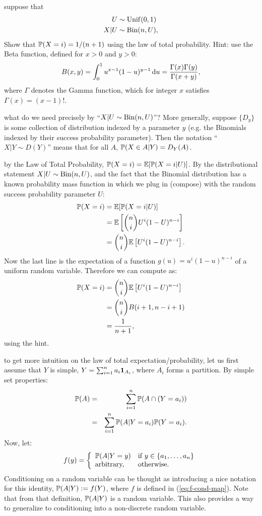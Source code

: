 \documentclass{article}
\begin{document}
 suppose that
\begin{eqnarray*}
U &\sim \Unif(0,1) \\
X | U &\sim \Bin(n, U),
\end{eqnarray*}
Show that $\P(X = i) = 1/(n+1)$ using the law of total probability. Hint: use the Beta function, defined for $x> 0$ and $y > 0$:
\[ B(x, y) = \int_0^1 u^{x-1} (1-u)^{y-1} \ud u = \frac{\Gamma(x) \Gamma(y)}{\Gamma(x+y)}, \]
where $\Gamma$ denotes the Gamma function, which for integer $x$ satisfies $\Gamma(x) = (x-1)!$.

 what do we need precisely by ``$X | U \sim \Bin(n, U)$''? More generally, suppose $\{D_y\}$ is some collection of distribution indexed by a parameter $y$ (e.g. the Binomials indexed by their success probability parameter). Then the notation ``$X|Y\sim D(Y)$'' means that for all $A$, $\P(X\in A|Y) = D_Y(A)$.

 by the Law of Total Probability, $\P(X=i) = \E[ \P(X=i | U) ]$. By the distributional statement $X|U \sim \Bin(n, U)$, and the fact that the Binomial distribution has a known probability mass function in which we plug in (compose) with the random success probability parameter $U$:
\begin{align*}
	\P(X = i) &= \E[ \P(X=i | U)] \\
	&= \E\left[ \binom{n}{i} U^i (1 - U)^{n-i} \right] \\
	&= \binom{n}{i} \E\left[ U^i (1-U)^{n-i} \right].
\end{align*}
Now the last line is the expectation of a function $g(u) = u^i (1-u)^{n-i}$ of a uniform random variable. Therefore we can compute as:
\begin{align*}
	\P(X = i) &= \binom{n}{i} \E\left[ U^i (1-U)^{n-i} \right] \\
	&= \binom{n}{i} B(i+1, n - i + 1) \\
	&= \frac{1}{n+1},
\end{align*}
using the hint.

 to get more intuition on the law of total expectation/probability, let us first assume that $Y$ is simple, $Y = \sum_{i=1}^n a_i \1_{A_i}$, where $A_i$ forms a partition. By simple set properties:
\begin{eqnarray*}
\P(A) &=& \sum_{i=1}^n \P(A \cap (Y=a_i)) \\
&=& \sum_{i=1}^n \P(A|Y=a_i) \P(Y = a_i).
\end{eqnarray*}
Now, let: 
\begin{equation}\label{eq:f-cond-map} 
f(y) = \bracearraycond{
  \P(A|Y=y) &\text{if }y\in\{a_1, \dots, a_n\} \\ 
  \text{arbitrary,} & \text{otherwise.}
}
\end{equation}
Conditioning on a random variable can be thought as introducing a nice notation for this identity, $\P(A|Y) := f(Y)$, where $f$ is defined in (\ref{eq:f-cond-map}). Note that from that definition, $\P(A|Y)$ is a random variable.  This also provides a way to generalize to conditioning into a non-discrete random variable.
\end{document}

